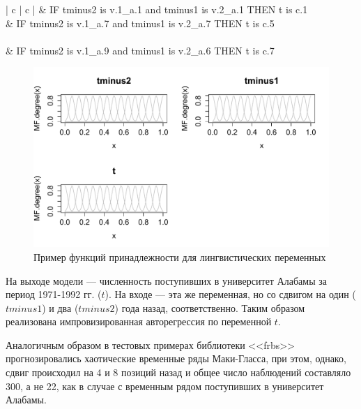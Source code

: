 \renewcommand{\arraystretch}{1.5} %
\setlength{\tabcolsep}{8pt} %

\begin{table}[bhtp]
	\caption{Пример нечетких правил}
		\begin{tabular}{ | c | c | }
			 & IF tminus2 is  v.1\_a.1 and tminus1 is  v.2\_a.1 THEN   t  is  c.1 \\
			 & IF tminus2 is  v.1\_a.7 and tminus1 is  v.2\_a.7 THEN   t  is  c.5  \\
			\hline
			 \\
			 & IF tminus2 is  v.1\_a.9 and tminus1 is  v.2\_a.6 THEN   t  is  c.7 \\
			\hline
		\end{tabular}		
	\label{table:fuzzy_rules_example}	
\end{table}

\begin{figure}[bhtp]
    \includegraphics{images/MFexample.pdf}
    \caption{Пример функций принадлежности для лингвистических переменных}		
    \label{figure:MFexample}
\end{figure}

На выходе модели --- численность поступивших в университет Алабамы за период 1971-1992 гг. ($t$). На входе --- эта же переменная, но со сдвигом на один ($tminus1$) и два ($tminus2$) года назад, соответственно. Таким образом реализована импровизированная авторегрессия по переменной $t$. 

Аналогичным образом в тестовых примерах библиотеки <<frbs>> прогнозировались хаотические временные ряды Маки-Гласса, при этом, однако, сдвиг происходил на 4 и 8 позиций назад и общее число наблюдений составляло 300, а не 22, как в случае с временным рядом поступивших в университет Алабамы.

